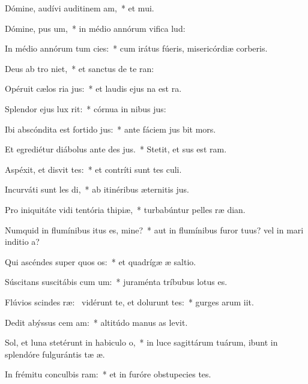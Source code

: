 \item Dómine, audívi auditinem am,~* et mui.
\item Dómine, pus um,~* in médio annórum vifica lud:
\item In médio annórum tum cies:~* cum irátus fúeris, misericórdiæ corberis.
\item Deus ab tro niet,~* et sanctus de te ran:
\item Opéruit cælos ria jus:~* et laudis ejus na est ra.
\item Splendor ejus  lux rit:~* córnua in nibus jus:
\item Ibi abscóndita est fortido jus:~* ante fáciem jus bit mors.
\item Et egrediétur diábolus ante des jus.~* Stetit, et sus est ram.
\item Aspéxit, et disvit tes:~* et contríti sunt tes culi.
\item Incurváti sunt les di,~* ab itinéribus æternitis jus.
\item Pro iniquitáte vidi tentória thipiæ,~* turbabúntur pelles ræ dian.
\item Numquid in flumínibus itus es, mine?~* aut in flumínibus furor tuus? vel in mari inditio a?
\item Qui ascéndes super quos os:~* et quadrígæ æ saltio.
\item Súscitans suscitábis cum um:~* juraménta tríbubus  lotus es.
\item Flúvios scindes ræ:~\pscross{} vidérunt te, et dolurunt tes:~* gurges arum iit.
\item Dedit abýssus cem am:~* altitúdo manus as levit.
\item Sol, et luna stetérunt in habiculo o,~* in luce sagittárum tuárum, ibunt in splendóre fulgurántis tæ æ.
\item In frémitu conculbis ram:~* et in furóre obstupecies tes.

